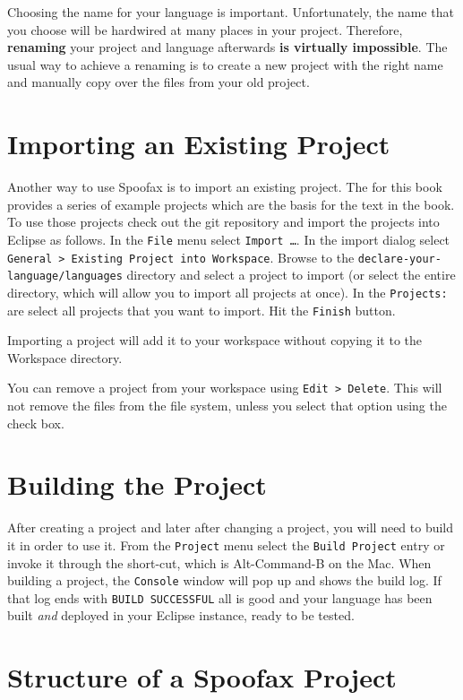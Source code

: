 Choosing the name for your language is important. Unfortunately, the name that
you choose will be hardwired at many places in your project. Therefore,
\textbf{renaming} your project and language afterwards \textbf{is virtually
impossible}.
The usual way to achieve a renaming is to create a new project with the right
name and manually copy over the files from your old project.

\section{Importing an Existing Project}

Another way to use Spoofax is to import an existing project. The
 for this book provides a series of example
projects which are the basis for the text in the book. To use those projects
check out the git repository and import the projects into Eclipse as follows.
In the \texttt{File} menu select \texttt{Import \ldots}. In the import dialog
select \texttt{General > Existing Project into Workspace}. Browse to the
\texttt{declare-your-language/languages} directory and select a project to
import (or select the entire directory, which will allow you to import all
projects at once). In the \texttt{Projects:} are select all projects that you
want to import. Hit the \texttt{Finish} button. 

Importing a project will add it to your workspace without copying it to the
Workspace directory.

You can remove a project from your workspace using \texttt{Edit > Delete}. This
will not remove the files from the file system, unless you select that option
using the check box.


\section{Building the Project}

After creating a project and later after changing a project, you will need to
build it in order to use it. From the \texttt{Project} menu select the
\texttt{Build Project} entry or invoke it through the short-cut, which is
Alt-Command-B on the Mac. When building a project, the \texttt{Console} window
will pop up and shows the build log. If that log ends with \texttt{BUILD
SUCCESSFUL} all is good and your language has been built \emph{and} deployed in
your Eclipse instance, ready to be tested.

\section{Structure of a Spoofax Project}

